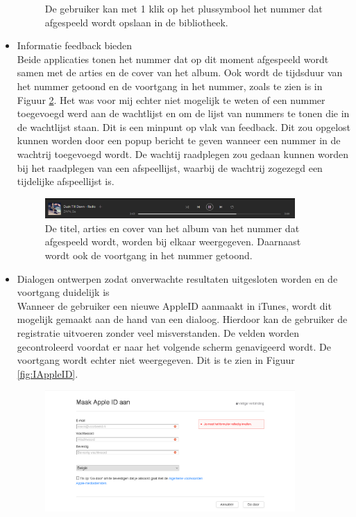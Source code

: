 \documentclass[11pt]{article}
\begin{document}
\begin{itemize}
\begin{figure}
		\caption{De gebruiker kan met 1 klik op het plussymbool het nummer dat afgespeeld wordt opslaan in de bibliotheek.}
		\label{fig:SOpslaan}
	\end{figure}
	\item Informatie feedback bieden\\
	Beide applicaties tonen het nummer dat op dit moment afgespeeld wordt samen met de arties en de cover van het album. Ook wordt de tijdsduur van het nummer getoond en de voortgang in het nummer, zoals te zien is in Figuur \ref{fig:SFeedback}. Het was voor mij echter niet mogelijk te weten of een nummer toegevoegd werd aan de wachtlijst en om de lijst van nummers te tonen die in de wachtlijst staan. Dit is een minpunt op vlak van feedback. Dit zou opgelost kunnen worden door een popup bericht te geven wanneer een nummer in de wachtrij toegevoegd wordt. De wachtij raadplegen zou gedaan kunnen worden bij het raadplegen van een afspeellijst, waarbij de wachtrij zogezegd een tijdelijke afspeellijst is.
	\begin{figure}
		\centering
		\includegraphics[width=0.9\textwidth]{SFeedback.png}
		\caption{De titel, arties en cover van het album van het nummer dat afgespeeld wordt, worden bij elkaar weergegeven. Daarnaast wordt ook de voortgang in het nummer getoond.}
		\label{fig:SFeedback}
	\end{figure}
	\item Dialogen ontwerpen zodat onverwachte resultaten uitgesloten worden en de voortgang duidelijk is\\
	Wanneer de gebruiker een nieuwe AppleID aanmaakt in iTunes, wordt dit mogelijk gemaakt aan de hand van een dialoog. Hierdoor kan de gebruiker de registratie uitvoeren zonder veel misverstanden. De velden worden gecontroleerd voordat er naar het volgende scherm genavigeerd wordt. De voortgang wordt echter niet weergegeven. Dit is te zien in Figuur \ref{fig:IAppleID}.
	\begin{figure}
		\centering
		\includegraphics[width=0.9\textwidth]{IAppleID.png}

\end{figure}
\end{itemize}
\end{document}

